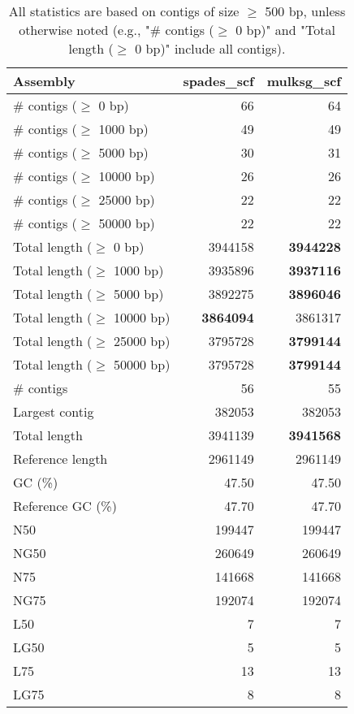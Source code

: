 \documentclass[12pt,a4paper]{article}
\begin{document}
\begin{table}[ht]
\begin{center}
\caption{All statistics are based on contigs of size $\geq$ 500 bp, unless otherwise noted (e.g., "\# contigs ($\geq$ 0 bp)" and "Total length ($\geq$ 0 bp)" include all contigs).}
\begin{tabular}{|l*{2}{|r}|}
\hline
Assembly & spades\_scf & mulksg\_scf \\ \hline
\# contigs ($\geq$ 0 bp) & 66 & 64 \\ \hline
\# contigs ($\geq$ 1000 bp) & 49 & 49 \\ \hline
\# contigs ($\geq$ 5000 bp) & 30 & 31 \\ \hline
\# contigs ($\geq$ 10000 bp) & 26 & 26 \\ \hline
\# contigs ($\geq$ 25000 bp) & 22 & 22 \\ \hline
\# contigs ($\geq$ 50000 bp) & 22 & 22 \\ \hline
Total length ($\geq$ 0 bp) & 3944158 & {\bf 3944228} \\ \hline
Total length ($\geq$ 1000 bp) & 3935896 & {\bf 3937116} \\ \hline
Total length ($\geq$ 5000 bp) & 3892275 & {\bf 3896046} \\ \hline
Total length ($\geq$ 10000 bp) & {\bf 3864094} & 3861317 \\ \hline
Total length ($\geq$ 25000 bp) & 3795728 & {\bf 3799144} \\ \hline
Total length ($\geq$ 50000 bp) & 3795728 & {\bf 3799144} \\ \hline
\# contigs & 56 & 55 \\ \hline
Largest contig & 382053 & 382053 \\ \hline
Total length & 3941139 & {\bf 3941568} \\ \hline
Reference length & 2961149 & 2961149 \\ \hline
GC (\%) & 47.50 & 47.50 \\ \hline
Reference GC (\%) & 47.70 & 47.70 \\ \hline
N50 & 199447 & 199447 \\ \hline
NG50 & 260649 & 260649 \\ \hline
N75 & 141668 & 141668 \\ \hline
NG75 & 192074 & 192074 \\ \hline
L50 & 7 & 7 \\ \hline
LG50 & 5 & 5 \\ \hline
L75 & 13 & 13 \\ \hline
LG75 & 8 & 8 \\ \hline

\end{tabular}
\end{center}
\end{table}
\end{document}
